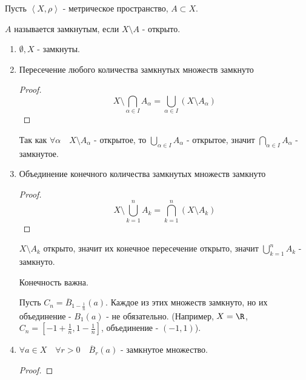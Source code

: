 \begin{definition} \thmslashn 

    Пусть $\left<X, \rho\right>$ - метрическое пространство, $A \subset X$.

    $A$ называется замкнутым, если $X \setminus A$ - открыто. 
\end{definition}
\begin{properties} \thmslashn

    \begin{enumerate}
        \item $ \emptyset, X$ - замкнуты.
        \item Пересечение любого количества замкнутых множеств замкнуто
            \begin{proof} \thmslashn
            
                \begin{equation*}
                        X \setminus \bigcap_{\alpha\in I} A_{\alpha} = \bigcup_{\alpha\in I} (X \setminus A_{\alpha}) 
                \end{equation*}
            \end{proof}

            Так как $\forall{\alpha}\quad X \setminus A_{\alpha}$ - открытое, то $\bigcup_{\alpha\in I} A_{\alpha}$ - открытое, значит $\bigcap_{\alpha\in I} A_{\alpha}$ - замкнутое.

        \item Объединение конечного количества замкнутых множеств замкнуто
            \begin{proof} \thmslashn
            
                \begin{equation*}
                    X \setminus \bigcup_{k = 1}^{n} A_{k} = \bigcap_{k = 1}^{n} (X \setminus A_{k})
                \end{equation*}
            \end{proof}

            $X \setminus A_{k}$ открыто, значит их конечное пересечение открыто, значит $\bigcup_{k=1}^{n} A_{k}$ - замкнуто.
            \begin{remark} \thmslashn
            
                Конечность важна.

                Пусть $C_{n} = \overline{B}_{1 - \frac{1}{n}}(a)$. Каждое из этих множеств замкнуто, но их объединение - $B_{1}(a)$ - не обязательно. (Например, $X = \R$, $C_{n} = \left[-1 + \frac{1}{n}, 1 - \frac{1}{n}\right]$, объединение - $(-1, 1)$).
            \end{remark}
        \item $\forall{a\in X}\quad \forall{r > 0}\quad \overline{B}_{r}(a)$ - замкнутое множество.
            \begin{proof} \thmslashn
            

\end{proof}
\end{enumerate}
\end{properties}
